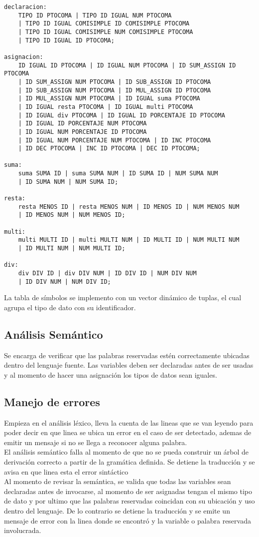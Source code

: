 \documentclass[aspectratio=169]{article}
\begin{document}
\begin{lstlisting}
declaracion:
	TIPO ID PTOCOMA | TIPO ID IGUAL NUM PTOCOMA
	| TIPO ID IGUAL COMISIMPLE ID COMISIMPLE PTOCOMA
	| TIPO ID IGUAL COMISIMPLE NUM COMISIMPLE PTOCOMA
	| TIPO ID IGUAL ID PTOCOMA;

asignacion:
	ID IGUAL ID PTOCOMA | ID IGUAL NUM PTOCOMA | ID SUM_ASSIGN ID PTOCOMA
	| ID SUM_ASSIGN NUM PTOCOMA | ID SUB_ASSIGN ID PTOCOMA
	| ID SUB_ASSIGN NUM PTOCOMA | ID MUL_ASSIGN ID PTOCOMA
	| ID MUL_ASSIGN NUM PTOCOMA | ID IGUAL suma PTOCOMA
	| ID IGUAL resta PTOCOMA | ID IGUAL multi PTOCOMA
	| ID IGUAL div PTOCOMA | ID IGUAL ID PORCENTAJE ID PTOCOMA
	| ID IGUAL ID PORCENTAJE NUM PTOCOMA
	| ID IGUAL NUM PORCENTAJE ID PTOCOMA
	| ID IGUAL NUM PORCENTAJE NUM PTOCOMA | ID INC PTOCOMA
	| ID DEC PTOCOMA | INC ID PTOCOMA | DEC ID PTOCOMA;

suma:
	suma SUMA ID | suma SUMA NUM | ID SUMA ID | NUM SUMA NUM
	| ID SUMA NUM | NUM SUMA ID;

resta:
	resta MENOS ID | resta MENOS NUM | ID MENOS ID | NUM MENOS NUM
	| ID MENOS NUM | NUM MENOS ID;

multi:
	multi MULTI ID | multi MULTI NUM | ID MULTI ID | NUM MULTI NUM
	| ID MULTI NUM | NUM MULTI ID;

div:
	div DIV ID | div DIV NUM | ID DIV ID | NUM DIV NUM
	| ID DIV NUM | NUM DIV ID;

\end{lstlisting}

La tabla de símbolos se implemento con un vector dinámico de tuplas, el cual agrupa el tipo de dato
con su identificador.


\subsection{An\'alisis Sem\'antico}

Se encarga de verificar que las palabras reservadas estén correctamente ubicadas dentro del lenguaje fuente.
Las variables deben ser declaradas antes de ser usadas y al momento de hacer una asignación los
tipos de datos sean iguales.

\subsection{Manejo de errores}

Empieza en el análisis léxico, lleva la cuenta de las lineas que se van leyendo para poder decir
en que linea se ubica un error en el caso de ser detectado, ademas de emitir un mensaje si no se llega
a reconocer alguna palabra.\\

El análisis semántico falla al momento de que no se pueda construir un árbol de derivación correcto
a partir de la gramática definida. Se detiene la traducción y se avisa en que linea esta el error sintáctico\\

Al momento de revisar la semántica, se valida que todas las variables sean declaradas antes de invocarse,
al momento de ser asignadas tengan el mismo tipo de dato y por ultimo que las palabras reservadas coincidan
con su ubicación y uso dentro del lenguaje. De lo contrario se detiene la traducción y se emite un mensaje
de error con la linea donde se encontró y la variable o palabra reservada involucrada.
\end{document}
